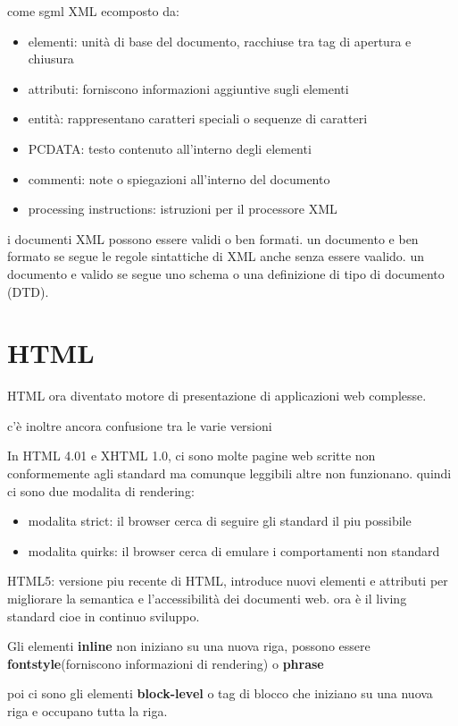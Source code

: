 \documentclass[12pt]{article}
\begin{document}
come sgml XML  ecomposto da:
\begin{itemize}
    \item elementi: unità di base del documento, racchiuse tra tag di apertura e chiusura
    \item attributi: forniscono informazioni aggiuntive sugli elementi
    \item entità: rappresentano caratteri speciali o sequenze di caratteri
    \item PCDATA: testo contenuto all'interno degli elementi
    \item commenti: note o spiegazioni all'interno del documento
    \item processing instructions: istruzioni per il processore XML
\end{itemize}

i documenti XML possono essere validi o ben formati.
un documento e ben formato se segue le regole sintattiche di XML anche senza essere vaalido.
un documento e valido se segue uno schema o una definizione di tipo di documento (DTD).


\section{HTML}

HTML ora diventato motore di presentazione di applicazioni web complesse.

c'è inoltre ancora confusione tra le varie versioni

In HTML 4.01 e XHTML 1.0,
ci sono molte pagine web scritte non conformemente agli standard ma comunque leggibili altre non funzionano.
quindi ci sono due modalita di rendering:
\begin{itemize}
    \item modalita strict: il browser cerca di seguire gli standard il piu possibile
    \item modalita quirks: il browser cerca di emulare i comportamenti non standard
\end{itemize}

HTML5: versione piu recente di HTML, introduce nuovi elementi e attributi per migliorare la semantica e l'accessibilità dei documenti web.
ora è il living standard cioe in continuo sviluppo.

Gli elementi \textbf{inline} non iniziano su una nuova riga, possono essere \textbf{fontstyle}(forniscono informazioni di rendering) o \textbf{phrase}

poi ci sono gli elementi \textbf{block-level} o tag di blocco che iniziano su una nuova riga e occupano tutta la riga.
\end{document}
